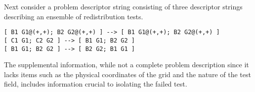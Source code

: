 Next consider a problem descriptor string consisting of three descriptor strings describing an ensemble of redistribution tests. 

\begin{verbatim}
[ B1 G1@(+,+); B2 G2@(+,+) ] --> [ B1 G1@(+,+); B2 G2@(+,+) ] 
[ C1 G1; C2 G2 ] --> [ B1 G1; B2 G2 ]
[ B1 G1; B2 G2 ] --> [ B2 G2; B1 G1 ]
\end{verbatim}


The supplemental information, while not a complete problem description since it lacks items such as the physical coordinates of the grid and the nature of the test field, includes information crucial to isolating the failed test.





